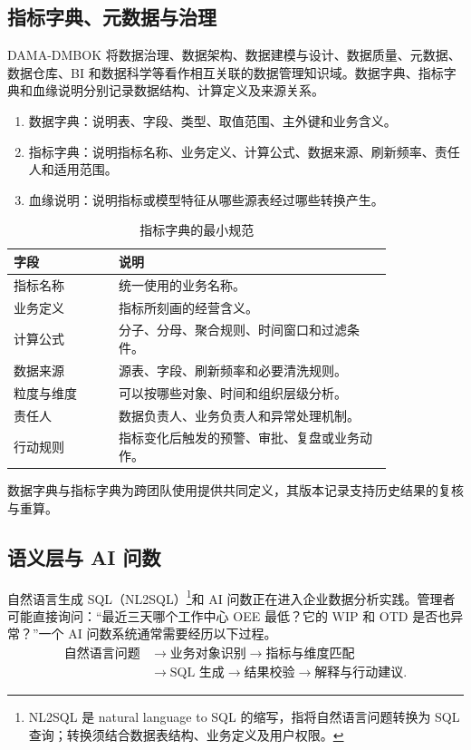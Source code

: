 \subsection{指标字典、元数据与治理}

DAMA-DMBOK 将数据治理、数据架构、数据建模与设计、数据质量、元数据、数据仓库、BI 和数据科学等看作相互关联的数据管理知识域。数据字典、指标字典和血缘说明分别记录数据结构、计算定义及来源关系。

\begin{enumerate}
  \item 数据字典：说明表、字段、类型、取值范围、主外键和业务含义。
  \item 指标字典：说明指标名称、业务定义、计算公式、数据来源、刷新频率、责任人和适用范围。
  \item 血缘说明：说明指标或模型特征从哪些源表经过哪些转换产生。
\end{enumerate}

\begin{table}[htbp]
\centering
\caption{指标字典的最小规范}
\begin{tabular}{P{0.23\linewidth}P{0.60\linewidth}}
\toprule
{}
字段 & 说明\\
\midrule
指标名称 & 统一使用的业务名称。\\
业务定义 & 指标所刻画的经营含义。\\
计算公式 & 分子、分母、聚合规则、时间窗口和过滤条件。\\
数据来源 & 源表、字段、刷新频率和必要清洗规则。\\
粒度与维度 & 可以按哪些对象、时间和组织层级分析。\\
责任人 & 数据负责人、业务负责人和异常处理机制。\\
行动规则 & 指标变化后触发的预警、审批、复盘或业务动作。\\
\bottomrule
\end{tabular}
\end{table}

数据字典与指标字典为跨团队使用提供共同定义，其版本记录支持历史结果的复核与重算。

\subsection{语义层与 AI 问数}

自然语言生成 SQL（NL2SQL）\footnote{NL2SQL 是 natural language to SQL 的缩写，指将自然语言问题转换为 SQL 查询；转换须结合数据表结构、业务定义及用户权限。}和 AI 问数正在进入企业数据分析实践。管理者可能直接询问：“最近三天哪个工作中心 OEE 最低？它的 WIP 和 OTD 是否也异常？”一个 AI 问数系统通常需要经历以下过程。
\[
\begin{aligned}
\text{自然语言问题}
&\rightarrow
\text{业务对象识别}
\rightarrow
\text{指标与维度匹配}\\
&\rightarrow
\text{SQL 生成}
\rightarrow
\text{结果校验}
\rightarrow
\text{解释与行动建议}.
\end{aligned}
\]

